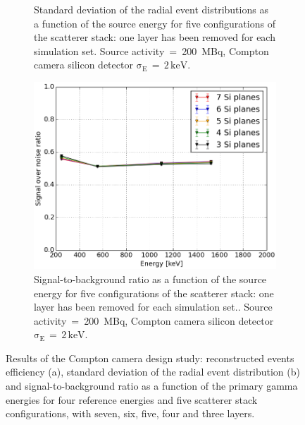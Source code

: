 \begin{figure}[h!]
\begin{subfigure}[t]{.5\textwidth}
  \caption{Standard deviation of the radial event distributions as a function of the source energy for five configurations of the scatterer stack: one layer has been removed for each simulation set. Source activity~=~200~MBq, Compton camera silicon detector $\mathrm{\sigma_{E}\,=\,2\,keV}$.}
  \label{chap5::fig::design_rms}
\end{subfigure}
\begin{subfigure}[t]{.5\textwidth}
\centering
  \includegraphics[width=.95\linewidth]{03_GraphicFiles/chapter5_SPECTsimu/SPECT/compton/geometry/ReffVSenergy_NSiplanes.png}
  \caption{Signal-to-background ratio as a function of the source energy for five configurations of the scatterer stack: one layer has been removed for each simulation set.. Source activity~=~200~MBq, Compton camera silicon detector $\mathrm{\sigma_{E}\,=\,2\,keV}$.}
  \label{chap5::fig::design_SONR}
\end{subfigure}
\caption{Results of the Compton camera design study: reconstructed events efficiency (a), standard deviation of the radial event distribution (b) and signal-to-background ratio as a function of the primary gamma energies for four reference energies and five scatterer stack configurations, with seven, six, five, four and three layers.}
\label{chap5::fig::design}
\end{figure} 

